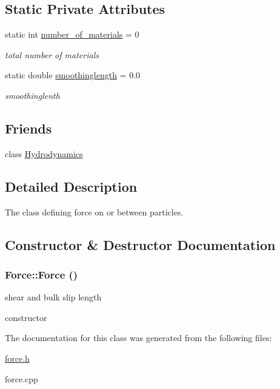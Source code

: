 \subsection*{Static Private Attributes}
\begin{CompactItemize}
\item 
\hypertarget{classForce_84055a493186144b98ab363bd958095f}{
static int \hyperlink{classForce_84055a493186144b98ab363bd958095f}{number\_\-of\_\-materials} = 0}
\label{classForce_84055a493186144b98ab363bd958095f}

\begin{CompactList}\small\item\em total number of materials \item\end{CompactList}\item 
\hypertarget{classForce_bcab616ac69fe78d87567506dedd8a56}{
static double \hyperlink{classForce_bcab616ac69fe78d87567506dedd8a56}{smoothinglength} = 0.0}
\label{classForce_bcab616ac69fe78d87567506dedd8a56}

\begin{CompactList}\small\item\em smoothinglenth \item\end{CompactList}\end{CompactItemize}
\subsection*{Friends}
\begin{CompactItemize}
\item 
\hypertarget{classForce_652e6d35f07e2091db6c1d01e86e2286}{
class \hyperlink{classForce_652e6d35f07e2091db6c1d01e86e2286}{Hydrodynamics}}
\label{classForce_652e6d35f07e2091db6c1d01e86e2286}

\end{CompactItemize}


\subsection{Detailed Description}
The class defining force on or between particles. 

\subsection{Constructor \& Destructor Documentation}
\hypertarget{classForce_00983e3bbc206a00bb9253deafc4e424}{
\subsubsection[{Force}]{\setlength{\rightskip}{0pt plus 5cm}Force::Force ()}}
\label{classForce_00983e3bbc206a00bb9253deafc4e424}


shear and bulk slip length 

constructor 

The documentation for this class was generated from the following files:\begin{CompactItemize}
\item 
\hyperlink{force_8h}{force.h}\item 
force.cpp\end{CompactItemize}
